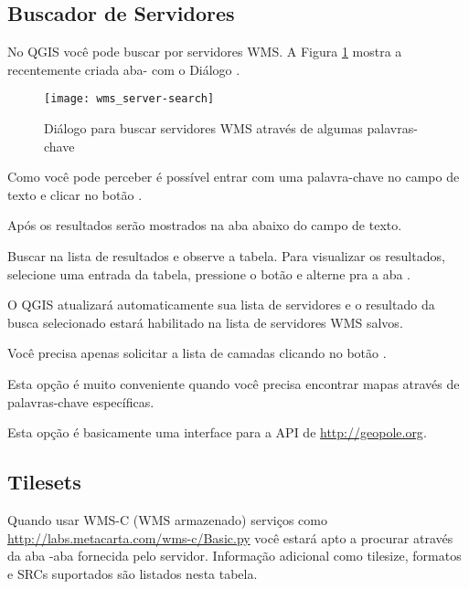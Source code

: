 % 
%
\subsection{Buscador de Servidores}
\label{sec:serversearch}

No QGIS você pode buscar por servidores WMS. A Figura \ref{fig:searchtab} mostra a recentemente criada aba- com o Diálogo .

\begin{figure}[ht]
  \centering
  \texttt{[image: wms\_server-search]}
  	\caption{Diálogo para buscar servidores WMS através de algumas palavras-chave \nixcaption}\label{fig:searchtab}
\end{figure}

Como você pode perceber é possível entrar com uma palavra-chave no campo de texto e clicar no botão .

Após os resultados serão mostrados na aba abaixo do campo de texto.

Buscar na lista de resultados e observe a tabela. Para visualizar os resultados, selecione uma entrada da tabela, pressione o botão  e alterne pra a aba .

O QGIS atualizará automaticamente sua lista de servidores e o resultado da busca selecionado estará habilitado na lista de servidores WMS salvos.

Você precisa apenas solicitar a lista de camadas clicando no botão .

Esta opção é muito conveniente quando você precisa encontrar mapas através de palavras-chave específicas.

Esta opção é basicamente uma interface para a API de \url{http://geopole.org}.

%
%
\subsection{Tilesets}\label{sec:tilesets}

Quando usar WMS-C (WMS armazenado) serviços como \url{http://labs.metacarta.com/wms-c/Basic.py} você estará apto a procurar através da aba -aba fornecida pelo servidor. Informação adicional como tilesize, formatos e SRCs suportados são listados nesta tabela.

